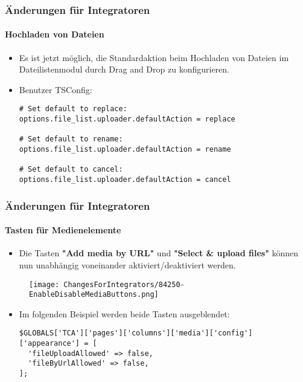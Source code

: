 \begin{frame}[fragile]
	\frametitle{Änderungen für Integratoren}
	\framesubtitle{Hochladen von Dateien}

	\lstset{basicstyle=\smaller\ttfamily}

	\begin{itemize}
		\item Es ist jetzt möglich, die Standardaktion beim Hochladen von Dateien im Dateilistenmodul durch Drag and Drop zu konfigurieren.
		\item Benutzer TSConfig:

\begin{lstlisting}
# Set default to replace:
options.file_list.uploader.defaultAction = replace

# Set default to rename:
options.file_list.uploader.defaultAction = rename

# Set default to cancel:
options.file_list.uploader.defaultAction = cancel
\end{lstlisting}

	\end{itemize}

\end{frame}


\begin{frame}[fragile]
	\frametitle{Änderungen für Integratoren}
	\framesubtitle{Tasten für Medienelemente}

	\lstset{basicstyle=\tiny\ttfamily}

	\begin{itemize}
		\item Die Tasten \textbf{"Add media by URL"} und \textbf{"Select \& upload files"}
			können nun unabhängig voneinander aktiviert/deaktiviert werden.
	\end{itemize}

	\begin{figure}
		\texttt{[image: ChangesForIntegrators/84250-EnableDisableMediaButtons.png]}
	\end{figure}

	\begin{itemize}
		\item Im folgenden Beispiel werden beide Tasten ausgeblendet:

\begin{lstlisting}
$GLOBALS['TCA']['pages']['columns']['media']['config']['appearance'] = [
  'fileUploadAllowed' => false,
  'fileByUrlAllowed' => false,
];
\end{lstlisting}

	\end{itemize}

\end{frame}

